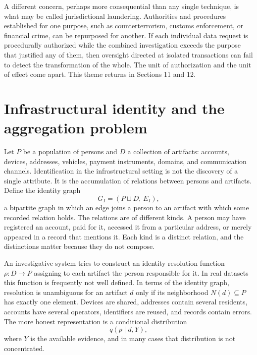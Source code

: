 \documentclass[11pt]{article}
\theoremstyle{definition}
\theoremstyle{remark}
\begin{document}
A different concern, perhaps more consequential than any single technique, is what may be called jurisdictional laundering. Authorities and procedures established for one purpose, such as counterterrorism, customs enforcement, or financial crime, can be repurposed for another. If each individual data request is procedurally authorized while the combined investigation exceeds the purpose that justified any of them, then oversight directed at isolated transactions can fail to detect the transformation of the whole. The unit of authorization and the unit of effect come apart. This theme returns in Sections 11 and 12.

\section{Infrastructural identity and the aggregation problem}

Let $P$ be a population of persons and $D$ a collection of artifacts: accounts, devices, addresses, vehicles, payment instruments, domains, and communication channels. Identification in the infrastructural setting is not the discovery of a single attribute. It is the accumulation of relations between persons and artifacts. Define the identity graph
\[
G_I = (P \sqcup D,\, E_I),
\]
a bipartite graph in which an edge joins a person to an artifact with which some recorded relation holds. The relations are of different kinds. A person may have registered an account, paid for it, accessed it from a particular address, or merely appeared in a record that mentions it. Each kind is a distinct relation, and the distinctions matter because they do not compose.

An investigative system tries to construct an identity resolution function $\rho : D \to P$ assigning to each artifact the person responsible for it. In real datasets this function is frequently not well defined. In terms of the identity graph, resolution is unambiguous for an artifact $d$ only if its neighborhood $N(d) \subseteq P$ has exactly one element. Devices are shared, addresses contain several residents, accounts have several operators, identifiers are reused, and records contain errors. The more honest representation is a conditional distribution
\[
q(p \mid d, Y),
\]
where $Y$ is the available evidence, and in many cases that distribution is not concentrated.
\end{document}
